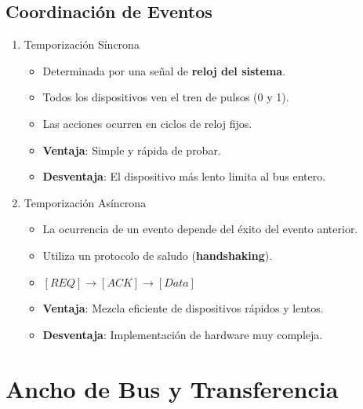 \documentclass[presentation]{beamer}
\begin{document}
\subsection{Coordinación de Eventos}
\label{sec:org0f9117f}
\begin{enumerate}
\item Temporización Síncrona
\label{sec:org6dff327}
\begin{itemize}
\item Determinada por una señal de \textbf{reloj del sistema}.
\item Todos los dispositivos ven el tren de pulsos (0 y 1).
\item Las acciones ocurren en ciclos de reloj fijos.
\item \textbf{Ventaja}: Simple y rápida de probar.
\item \textbf{Desventaja}: El dispositivo más lento limita al bus entero.
\end{itemize}

\item Temporización Asíncrona
\label{sec:org1b08da1}
\begin{itemize}
\item La ocurrencia de un evento depende del éxito del evento anterior.
\item Utiliza un protocolo de saludo (\textbf{handshaking}).
\item \([REQ] \rightarrow [ACK] \rightarrow [Data]\)
\item \textbf{Ventaja}: Mezcla eficiente de dispositivos rápidos y lentos.
\item \textbf{Desventaja}: Implementación de hardware muy compleja.
\end{itemize}
\end{enumerate}

\section{Ancho de Bus y Transferencia}
\label{sec:org89d89fd}
\end{document}
